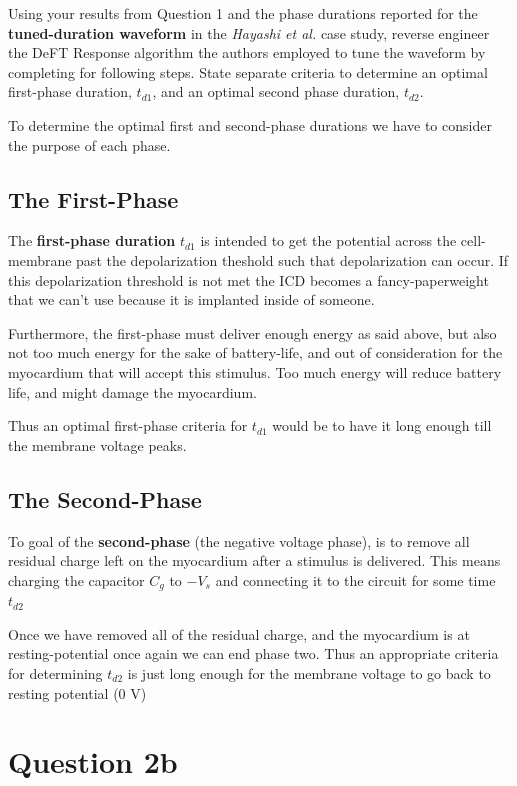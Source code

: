\documentclass[]{report}
\begin{document}
Using your results from Question 1 and the phase durations reported for the \textbf{tuned-duration 
waveform} in the \textit{Hayashi et al.} case study, reverse engineer the DeFT Response algorithm the 
authors employed to tune the waveform by completing for following steps. State separate criteria to determine an optimal first-phase duration, $t_{d1}$, and an optimal second
phase duration, $t_{d2}$.

To determine the optimal first and second-phase durations we have to consider the purpose of each phase.

\subsection*{The First-Phase}

The \textbf{first-phase duration} $t_{d1}$ is intended to get the potential across the cell-membrane past the depolarization theshold such that depolarization can occur. If this depolarization threshold is not met the ICD becomes a fancy-paperweight that we can't use because it is implanted inside of someone.

Furthermore, the first-phase must deliver enough energy as said above, but also not too much energy for the sake of battery-life, and out of consideration for the myocardium that will accept this stimulus. Too much energy will reduce battery life, and might damage the myocardium.

Thus an optimal first-phase criteria for $t_{d1}$ would be to have it long enough till the membrane voltage peaks. 


\subsection*{The Second-Phase}

To goal of the \textbf{second-phase} (the negative voltage phase), is to remove all residual charge left on the myocardium after a stimulus is delivered. This means charging the capacitor $C_g$ to $-V_s$ and connecting it to the circuit for some time $t_{d2}$

Once we have removed all of the residual charge, and the myocardium is at resting-potential once again we can end phase two. Thus an appropriate criteria for determining $t_{d2}$  is just long enough for the membrane voltage to go back to resting potential (0 V)


\section*{Question 2b}
\end{document}
